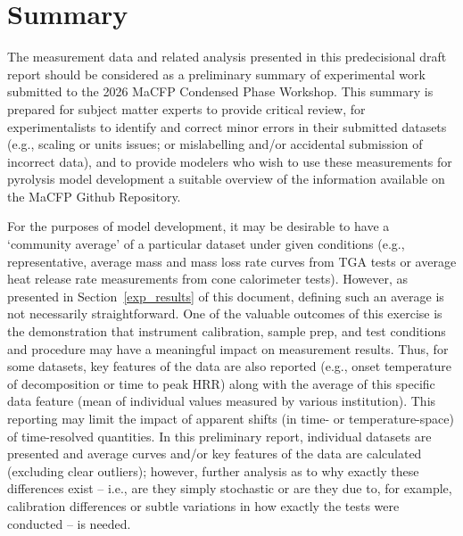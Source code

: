 \documentclass{book}
\begin{document}
\begin{table}[b]
\centering
\caption{Calculated effective broadband emissivity of `MaCFP Wood' and corresponding char samples between 293~K and 453~K.}

\label{tab:emissivity}
\end{table}


\chapter{Summary}
\label{Summary}
\vspace{-1cm}
The measurement data and related analysis presented in this predecisional draft report should be considered as a preliminary summary of experimental work submitted to the 2026 MaCFP Condensed Phase Workshop. This summary is prepared for subject matter experts to provide critical review, for experimentalists to identify and correct minor errors in their submitted datasets (e.g., scaling or units issues; or mislabelling and/or accidental submission of incorrect data), and to provide modelers who wish to use these measurements for pyrolysis model development a suitable overview of the information available on the MaCFP Github Repository.

For the purposes of model development, it may be desirable to have a `community average' of a particular dataset under given conditions (e.g., representative, average mass and mass loss rate curves from TGA tests or average heat release rate measurements from cone calorimeter tests). However, as presented in Section~\ref{exp_results} of this document, defining such an average is not necessarily straightforward. One of the valuable outcomes of this exercise is the demonstration that instrument calibration, sample prep, and test conditions and procedure may have a meaningful impact on measurement results. Thus, for some datasets, key features of the data are also reported (e.g., onset temperature of decomposition or time to peak HRR) along with the average of this specific data feature (mean of individual values measured by various institution). This reporting may limit the impact of apparent shifts (in time- or temperature-space) of time-resolved quantities. In this preliminary report, individual datasets are presented and average curves and/or key features of the data are calculated (excluding clear outliers); however, further analysis as to why exactly these differences exist -- i.e., are they simply stochastic or are they due to, for example, calibration differences or subtle variations in how exactly the tests were conducted -- is needed.
\end{document}
